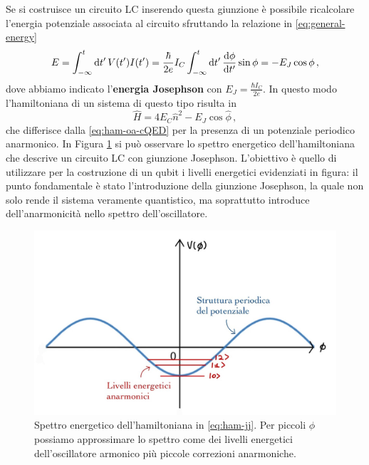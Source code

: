 Se si costruisce un circuito LC inserendo questa giunzione è possibile ricalcolare l'energia potenziale associata al circuito sfruttando la relazione in \eqref{eq:general-energy} 
\begin{equation}\label{eq:E_Josephson}
    E=\int_{-\infty}^{t} \dd{t'} V(t')I(t')=\frac{\hbar}{2e}I_C\int_{-\infty}^{t} \dd{t'} \derivative{\phi}{t'}\sin\phi =-E_J\cos\phi \, ,
\end{equation}
dove abbiamo indicato l'\textbf{energia Josephson} con $E_J = \frac{\hbar I_C}{2e}$. In questo modo l'hamiltoniana di un sistema di questo tipo risulta in
\begin{equation}\label{eq:ham-jj}
    \hat H = 4E_C\hat n^2-E_J\cos\hat \phi \, ,
\end{equation}
che differisce dalla \eqref{eq:ham-oa-cQED} per la presenza di un potenziale periodico anarmonico. In Figura \ref{fig:jj-spectrum} si può osservare lo spettro energetico dell'hamiltoniana che descrive un circuito LC con giunzione Josephson. L'obiettivo è quello di utilizzare per la costruzione di un qubit i livelli energetici evidenziati in figura: il punto fondamentale è stato l'introduzione della giunzione Josephson, la quale non solo rende il sistema veramente quantistico, ma soprattutto introduce dell'anarmonicità nello spettro dell'oscillatore. 

\begin{figure}[!ht]
    \centering
    \includegraphics[scale=0.35]{images/jj-spectrum.jpg}
    \caption{Spettro energetico dell'hamiltoniana in \eqref{eq:ham-jj}. Per piccoli $\phi$ possiamo approssimare lo spettro come dei livelli energetici dell'oscillatore armonico più piccole correzioni anarmoniche.}
    \label{fig:jj-spectrum}
\end{figure}


